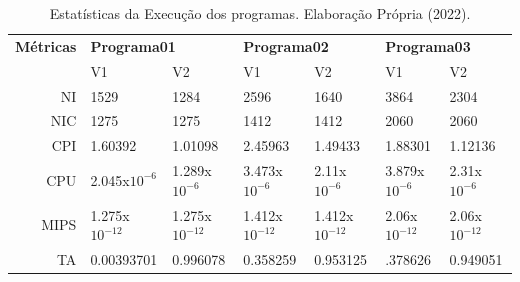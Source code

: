 \documentclass[12pt]{article}
\begin{document}
\begin{table}[ht]
  \caption{Estatísticas da Execução dos programas. Elaboração Própria (2022).}
  \begin{center}
    \label{tab_programas}
    \begin{tabular}{rllllll}
      \hline
      \small{\textbf{Métricas}} & \multicolumn{2}{l}{\small{\textbf{Programa01}}} & \multicolumn{2}{l}{\small{\textbf{Programa02}}} & \multicolumn{2}{l}{\small{\textbf{Programa03}}}                                                                                                     \\
                                & V1                                              & V2                                              & V1                                              & V2                              & V1                             & V2                             \\
      \hline
      NI                        & \footnotesize{1529}                             & \footnotesize{1284}                             & \footnotesize{2596}                             & \footnotesize{1640}             & \footnotesize{3864}            & \footnotesize{2304}            \\
      NIC                       & \footnotesize{1275}                             & \footnotesize{1275}                             & \footnotesize{1412}                             & \footnotesize{1412}             & \footnotesize{2060}            & \footnotesize{2060}            \\
      CPI                       & \footnotesize{1.60392}                          & \footnotesize{1.01098}                          & \footnotesize{2.45963}                          & \footnotesize{1.49433}          & \footnotesize{1.88301}         & \footnotesize{1.12136}         \\
      CPU                       & \footnotesize{2.045x$10^{-6}$}                  & \footnotesize{1.289x$10^{-6}$}                  & \footnotesize{3.473x$10^{-6}$}                  & \footnotesize{2.11x$10^{-6}$}   & \footnotesize{3.879x$10^{-6}$} & \footnotesize{2.31x$10^{-6}$}  \\
      MIPS                      & \footnotesize{1.275x$10^{-12}$}                 & \footnotesize{1.275x$10^{-12}$}                 & \footnotesize{1.412x$10^{-12}$}                 & \footnotesize{1.412x$10^{-12}$} & \footnotesize{2.06x$10^{-12}$} & \footnotesize{2.06x$10^{-12}$} \\
      TA                        & \footnotesize{0.00393701}                       & \footnotesize{0.996078}                         & \footnotesize{0.358259}                         & \footnotesize{0.953125}         & \footnotesize{.378626}         & \footnotesize{0.949051}        \\
    \end{tabular}
  \end{center}
  \label{tab:multicol}
\end{table}
\end{document}

